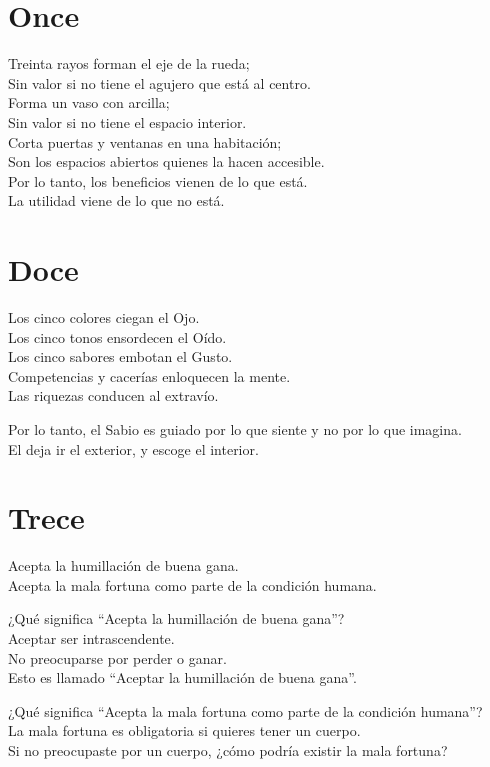 \documentclass[hidelinks]{memoir}
\begin{document}
	\chapter*{Once}
	
	Treinta rayos forman el eje de la rueda;\\
	Sin valor si no tiene el agujero que está al centro.\\
	Forma un vaso con arcilla;\\
	Sin valor si no tiene el espacio interior.\\
	Corta puertas y ventanas en una habitación;\\
	Son los espacios abiertos quienes la hacen accesible.\\
	Por lo tanto, los beneficios vienen de lo que está.\\
	La utilidad viene de lo que no está.
	
	\chapter*{Doce}
	
	Los cinco colores ciegan el Ojo.\\
	Los cinco tonos ensordecen el Oído.\\
	Los cinco sabores embotan el Gusto.\\
	Competencias y cacerías enloquecen la mente.\\
	Las riquezas conducen al extravío.
	
	Por lo tanto, el Sabio es guiado por lo que siente y no por lo que
	imagina.\\
	El deja ir el exterior, y escoge el interior.
	
	\chapter*{Trece}
	
	Acepta la humillación de buena gana.\\
	Acepta la mala fortuna como parte de la condición humana.
	
	¿Qué significa ``Acepta la humillación de buena gana''?\\
	Aceptar ser intrascendente.\\
	No preocuparse por perder o ganar.\\
	Esto es llamado ``Aceptar la humillación de buena gana''.
	
	¿Qué significa ``Acepta la mala fortuna como parte de la condición
	humana''?\\
	La mala fortuna es obligatoria si quieres tener un cuerpo.\\
	Si no preocupaste por un cuerpo, ¿cómo podría existir la mala fortuna?
	
\end{document}
